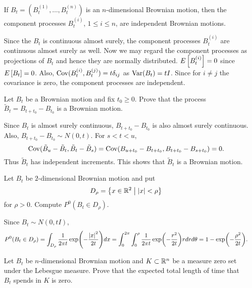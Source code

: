 \begin{exercise}{2.11}
    If $B_t = (B_t^{(1)},\ldots,B_t^{(n)})$ is an $n$-dimensional Brownian motion, 
    then the component processes $B_t^{(i)}$, $1\leq i\leq n$, are 
    independent Brownian motions. 
\end{exercise}
\begin{solution}
    Since the $B_t$ is continuous almost surely, the component processes 
    $B_t^{(i)}$ are continuous almost surely as well. Now we may regard 
    the component processes as projections of $B_t$ and hence they are 
    normally distributed. $E\left[ {B_t^{(i)}} \right] = 0$ since $E\left[ {B_t} \right] = 0$. 
    Also, $\operatorname{Cov}(B_t^{(i)}, B_t^{(j)}) = t\delta_{ij}$ as $\operatorname{Var}(B_t) = tI$. 
    Since for $i\neq j$ the covariance is zero, the component processes 
    are independent. 
\end{solution}

\begin{exercise}{2.12}
    Let $B_t$ be a Brownian motion and fix $t_0\geq 0$. Prove that the process 
    $\tilde{B}_t = B_{t+t_0} - B_{t_0}$ is a Brownian motion. 
\end{exercise}
\begin{solution}
    Since $B_t$ is almost surely continuous, $B_{t+t_0} - B_{t_0}$ is also 
    almost surely continuous. Also, $B_{t+t_0} - B_{t_0}\sim N(0, t)$. For 
    $s<t<u$, 
    \begin{equation*}
        \operatorname{Cov}(\tilde{B}_u - \tilde{B}_t, \tilde{B}_t - \tilde{B}_s) 
        = \operatorname{Cov}(B_{u+t_0}-B_{t+t_0}, B_{t+t_0}-B_{s+t_0}) = 0. 
    \end{equation*}
    Thus $\tilde{B}_t$ has independent increments. This shows that 
    $\tilde{B}_t$ is a Brownian motion.
\end{solution}

\begin{exercise}{2.13}
    Let $B_t$ be $2$-dimensional Brownian motion and put 
    \begin{equation*}
        D_\rho = \left\{ x\in\mathbb{R}^2 \;\middle\vert\; \left\lvert {x} \right\rvert<\rho \right\}
    \end{equation*}
    for $\rho > 0$. Compute $P^0(B_t\in D_\rho)$. 
\end{exercise}
\begin{solution}
    Since $B_t\sim N(0, tI)$, 
    \begin{equation*}
        P^0(B_t\in D_\rho) = \int_{D_\rho} \frac{1}{2\pi t}\exp\pth{-\frac{\abs{x}^2}{2t}}dx 
        = \int_0^{2\pi}\int_0^\rho \frac{1}{2\pi t}\exp\pth{-\frac{r^2}{2t}}rdrd\theta 
        = 1 - \exp\pth{-\frac{\rho^2}{2t}}.
    \end{equation*}
\end{solution}

\begin{exercise}{2.14}
    Let $B_t$ be $n$-dimensional Brownian motion and $K\subset\mathbb{R}^n$ be a measure 
    zero set under the Lebesgue measure. Prove that the expected total length 
    of time that $B_t$ spends in $K$ is zero. 
\end{exercise}